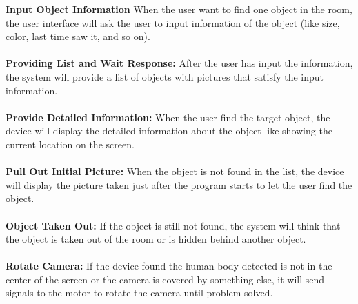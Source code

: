 \documentclass[12pt]{article}
\begin{document}
\textbf{Input Object Information} When the user want to find one object in the room, the user interface will ask the user to input information of the object (like size, color, last time saw it, and so on).\\\\
\textbf{Providing List and Wait Response:} After the user has input the information, the system will provide a list of objects with pictures that satisfy the input information.\\\\
\textbf{Provide Detailed Information:} When the user find the target object, the device will display the detailed information about the object like showing the current location on the screen. \\\\
\textbf{Pull Out Initial Picture:} When the object is not found in the list, the device will display the picture taken just after the program starts to let the user find the object.\\\\
\textbf{Object Taken Out:} If the object is still not found, the system will think that the object is taken out of the room or is hidden behind another object. \\\\
\textbf{Rotate Camera:} If the device found the human body detected is not in the center of the screen or the camera is covered by something else, it will send signals to the motor to rotate the camera until problem solved. 
\end{document}
